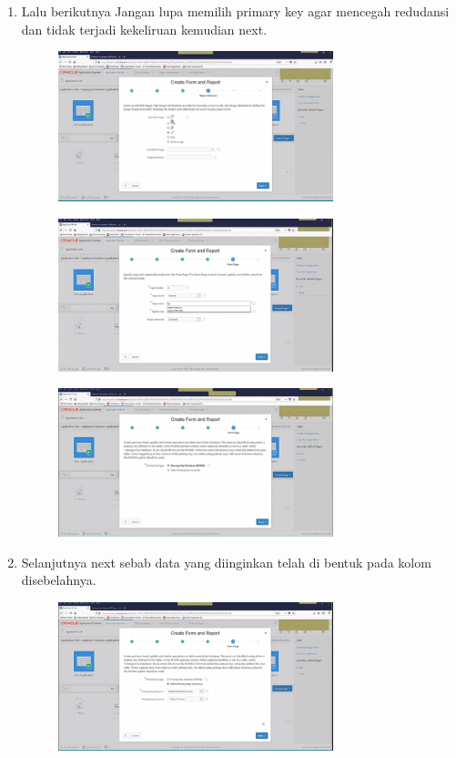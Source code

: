 \documentclass{article}
\begin{document}
\begin{enumerate}
\begin{figure}[h]
            \end{figure}
\newpage\item  Lalu  berikutnya Jangan lupa memilih primary key agar mencegah redudansi dan tidak terjadi kekeliruan kemudian next.
\begin{figure}[h]
\centerline{\includegraphics[width=8cm]{figure/R1.png}}
            \end{figure}
\begin{figure}[h]
\centerline{\includegraphics[width=8cm]{figure/R2.png}}
            \end{figure}
            \begin{figure}[h]
\centerline{\includegraphics[width=8cm]{figure/R3.png}}
            \end{figure}
\newpage\item  Selanjutnya next sebab data yang diinginkan telah di bentuk pada kolom disebelahnya. 
\begin{figure}[h]
\centerline{\includegraphics[width=8cm]{figure/S1.png}}

\end{figure}
\end{enumerate}
\end{document}
